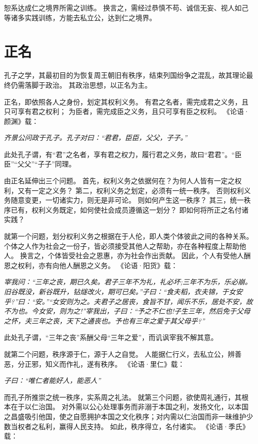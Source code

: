 \documentclass[11pt]{article}
\begin{document}
恕系达成仁之境界所需之训练。
换言之，需经过恭慎不苟、诚信无妄、视人如己等诸多实践训练，方能去私立公，达到仁之境界。

\section{正名}
孔子之学，其最初目的为恢复周王朝旧有秩序，结束列国纷争之混乱，故其理论最终仍需落脚于政治。
其政治思想，以正名为主。

\newline

正名，即依照各人之身份，划定其权利义务。
有君之名者，需完成君之义务，且只可享有君之权利；
为臣者，需完成臣之义务，且只可享有臣之权利。
《论语·颜渊》载：

\textit{齐景公问政于孔子。孔子对曰：“君君，臣臣，父父，子子。”}

此处孔子谓，有“君”之名者，享有君之权力，履行君之义务，故曰“君君”。“臣臣”“父父”“子子”同理。

\newline

由正名延伸出三个问题。
首先，权利义务之依据何在？为何人人皆有一定之权利，又有一定之义务？
第二，权利义务之划定，必须有一统一秩序。
否则权利义务随意变更，一切诸实力，则无是非可论。
则如何产生这一秩序？
其三，统一秩序已有，权利义务既定，如何使社会成员遵循这一划分？
即如何将所正之名付诸实践？

\newline

就第一个问题，划分权利义务之根据在于人伦，即人类个体彼此之间的各种关系。
个体之人作为社会之一份子，皆必须接受其他人之帮助，亦在各种程度上帮助他人。
换言之，个体皆受社会之恩惠，亦为社会作出贡献。
因此，个人有受他人酬恩之权利，亦有向他人酬恩之义务。
《论语·阳货》载：

\textit{宰我问：“三年之丧，期已久矣。君子三年不为礼，礼必坏;三年不为乐，乐必崩。旧谷既没，新谷既升，钻燧改火，期可已矣。”子曰：“食夫稻，衣夫锦，于女安乎?”曰：“安。”“女安则为之。夫君子之居丧，食旨不甘，闻乐不乐，居处不安，故不为也。今女安，则为之!”宰我出，子曰：“予之不仁也!子生三年，然后免于父母之怀，夫三年之丧，天下之通丧也。予也有三年之爱于其父母乎?”}

此处孔子谓，“三年之丧”系酬父母“三年之爱”，而讥讽宰我不解其意。

就第二个问题，秩序源于仁，源于人之自觉。
人能据仁行义，去私立公，辨善恶，分正邪，知义而作礼，遂有秩序。
《论语·里仁》载：

\textit{子曰：“唯仁者能好人，能恶人”}

而孔子所推崇之统一秩序，实系周之礼法。
就第三个问题，欲使周礼通行，其根本在于以仁治国。
对外需以公心处理事务而非溺于本国之利，发扬文化，以本国之昌盛吸引他国，使之自愿拥护本国之文化秩序；对内需以仁治国而非一昧维护少数当权者之私利，赢得人民支持。
如此，秩序得立，名付诸实。
《论语·季氏》载：
\end{document}
